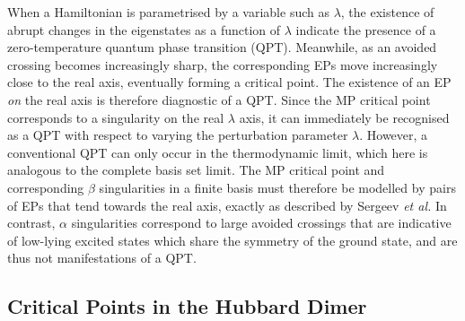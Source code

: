 \documentclass[aps,prb,reprint,noshowkeys,superscriptaddress]{revtex4-1}
\newcommand{\etal}{\textit{et al.}}
\begin{document}
When a Hamiltonian is parametrised by a variable such as $\lambda$, the existence of abrupt changes in the 
eigenstates as a function of $\lambda$ indicate the presence of a zero-temperature quantum phase transition (QPT).%
\cite{Heiss_1988,Heiss_2002,Borisov_2015,Sindelka_2017,CarrBook,Vojta_2003,SachdevBook,GilmoreBook} 
Meanwhile, as an avoided crossing becomes increasingly sharp, the corresponding EPs move increasingly close to the real axis, eventually forming a critical point.
The existence of an EP \emph{on} the real axis is therefore diagnostic of a QPT.\cite{Cejnar_2005, Cejnar_2007a}
Since the MP critical point corresponds to a singularity on the real $\lambda$ axis, it can immediately be
recognised as a QPT with respect to varying the perturbation parameter $\lambda$.
However, a conventional QPT can only occur in the thermodynamic limit, which here is analogous to the complete 
basis set limit.\cite{Kais_2006}
The MP critical point and corresponding $\beta$ singularities in a finite basis must therefore be modelled by pairs of EPs
that tend towards the real axis, exactly as described by Sergeev \etal\cite{Sergeev_2005}
In contrast, $\alpha$ singularities correspond to large avoided crossings that are indicative of low-lying excited
states which share the symmetry of the ground state,\cite{Goodson_2004} and are thus not manifestations of a QPT.

\subsection{Critical Points in the Hubbard Dimer}
\label{sec:critical_point_hubbard}
\end{document}

